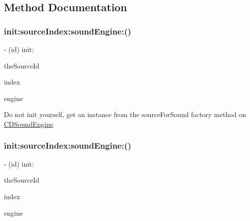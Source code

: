 \subsection{Method Documentation}
\mbox{\label{interfaceCDSoundSource_a1238cf4aee74d345437dba31efce78ab}} 
\subsubsection{\texorpdfstring{init\+:source\+Index\+:sound\+Engine\+:()}{init:sourceIndex:soundEngine:()}\hspace{0.1cm}{\footnotesize\ttfamily [1/4]}}
{\footnotesize\ttfamily -\/ (id) init\+: \begin{DoxyParamCaption}\item[{(A\+Luint)}]{the\+Source\+Id }\item[{sourceIndex:(int)}]{index }\item[{soundEngine:(\hyperlink{interfaceCDSoundEngine}{C\+D\+Sound\+Engine}$\ast$)}]{engine }\end{DoxyParamCaption}}

Do not init yourself, get an instance from the source\+For\+Sound factory method on \hyperlink{interfaceCDSoundEngine}{C\+D\+Sound\+Engine} \mbox{\label{interfaceCDSoundSource_a1238cf4aee74d345437dba31efce78ab}} 
\subsubsection{\texorpdfstring{init\+:source\+Index\+:sound\+Engine\+:()}{init:sourceIndex:soundEngine:()}\hspace{0.1cm}{\footnotesize\ttfamily [2/4]}}
{\footnotesize\ttfamily -\/ (id) init\+: \begin{DoxyParamCaption}\item[{(A\+Luint)}]{the\+Source\+Id }\item[{sourceIndex:(int)}]{index }\item[{soundEngine:(\hyperlink{interfaceCDSoundEngine}{C\+D\+Sound\+Engine} $\ast$)}]{engine }\end{DoxyParamCaption}}

